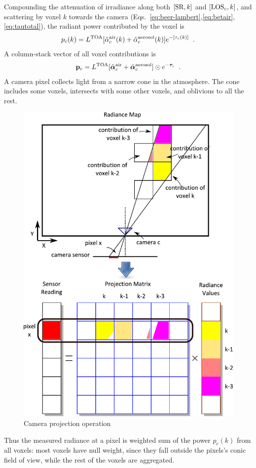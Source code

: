 \documentclass[10pt,twocolumn,letterpaper]{article}
\newcommand{\vect}[1]{\bm{#1}}
\begin{document}
Compounding the attenuation of irradiance along both $[{\rm SR},k]$ and $[{\rm LOS}_c,k]$, and scattering
by voxel $k$ towards the camera (Eqs.~\ref{eq:beer-lambert},\ref{eq:betair},\ref{eq:tautotal}), the radiant power contributed by the voxel is
\begin{equation}
  p_c(k)= L^{\rm TOA}
          [\tilde{\alpha}^{\rm air}_c(k) + \tilde{\alpha}^{\rm aerosol}_c(k)]
          e^{-[\tau_c(k)]}
  \;\;.
  \label{eq:ick}
\end{equation}
A column-stack vector of all voxel contributions is
\begin{equation}
 {\bf p}_c= L^{\rm TOA}
          [\tilde{\vect{\alpha}}^{\rm air}_c + \tilde{\vect{\alpha}}^{\rm aerosol}_c]
           \odot e^{-\vect{\tau}_c}
  \;\;.
  \label{eq:pc}
\end{equation}
A camera pixel collects light from a narrow cone in the atmosphere.
The cone includes some voxels, intersects with some other voxels, and oblivious to all the rest.
\begin{figure}
  \centering
    \includegraphics[width=\columnwidth]{images/sensor.pdf}
  \caption{Camera projection operation}
  \label{fig:projection}
\end{figure}
Thus the measured radiance at a pixel is weighted sum of the power $p_c(k)$ from all voxels: most voxels have null weight, since they fall outside the pixels's conic field of view, while the rest of the voxels are aggregated.
\end{document}

